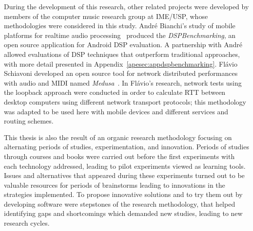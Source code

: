 During the development of this research, other related projects were developed by members of the computer music research group at IME/USP, whose methodologies were considered in this study.
André Bianchi's study of mobile platforms for realtime audio processing~\cite{Bianchi2012ontheperformance} produced the \textit{DSPBenchmarking}, an open source application for Android DSP evaluation.
A partnership with André allowed evaluations of DSP techniques that outperform traditional approaches, with more detail presented in Appendix~\ref{apesec:appdspbenchmarking}.
Flávio Schiavoni developed an open source tool for network distributed performances with audio and MIDI named \textit{Medusa}~\cite{Schiavoni2011medusa}.
In Flávio's research, network tests using the loopback approach were conducted in order to calculate RTT between desktop computers using different network transport protocols; this methodology was adapted to be used here with mobile devices and different services and routing schemes.




This thesis is also the result of an organic research methodology focusing on alternating periods of studies, experimentation, and innovation.
Periods of studies through courses and books were carried out before the first experiments with each technology addressed, leading to pilot experiments viewed as learning tools.
Issues and alternatives that appeared during these experiments turned out to be valuable resources for periods of brainstorms leading to innovations in the strategies implemented.
To propose innovative solutions and to try them out by developing software were stepstones of the research methodology, that helped identifying gaps and shortcomings which demanded new studies, leading to new research cycles.

